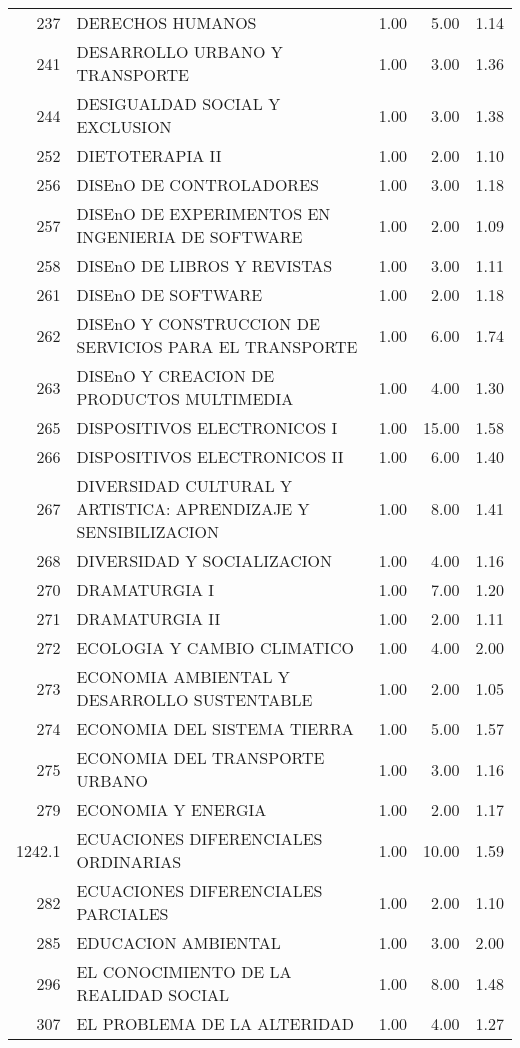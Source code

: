 \documentclass[12pt]{article}
\begin{document}
\begin{table}[ht]
\begin{tabular}{rlrrr}
  237 & DERECHOS HUMANOS & 1.00 & 5.00 & 1.14 \\ 
  241 & DESARROLLO URBANO Y TRANSPORTE & 1.00 & 3.00 & 1.36 \\ 
  244 & DESIGUALDAD SOCIAL Y EXCLUSION & 1.00 & 3.00 & 1.38 \\ 
  252 & DIETOTERAPIA II & 1.00 & 2.00 & 1.10 \\ 
  256 & DISEnO DE CONTROLADORES & 1.00 & 3.00 & 1.18 \\ 
  257 & DISEnO DE EXPERIMENTOS EN INGENIERIA DE SOFTWARE & 1.00 & 2.00 & 1.09 \\ 
  258 & DISEnO DE LIBROS Y REVISTAS & 1.00 & 3.00 & 1.11 \\ 
  261 & DISEnO DE SOFTWARE & 1.00 & 2.00 & 1.18 \\ 
  262 & DISEnO Y CONSTRUCCION DE SERVICIOS PARA EL TRANSPORTE & 1.00 & 6.00 & 1.74 \\ 
  263 & DISEnO Y CREACION DE PRODUCTOS MULTIMEDIA & 1.00 & 4.00 & 1.30 \\ 
  265 & DISPOSITIVOS ELECTRONICOS I & 1.00 & 15.00 & 1.58 \\ 
  266 & DISPOSITIVOS ELECTRONICOS II & 1.00 & 6.00 & 1.40 \\ 
  267 & DIVERSIDAD CULTURAL Y ARTISTICA: APRENDIZAJE Y SENSIBILIZACION & 1.00 & 8.00 & 1.41 \\ 
  268 & DIVERSIDAD Y SOCIALIZACION & 1.00 & 4.00 & 1.16 \\ 
  270 & DRAMATURGIA I & 1.00 & 7.00 & 1.20 \\ 
  271 & DRAMATURGIA II & 1.00 & 2.00 & 1.11 \\ 
  272 & ECOLOGIA Y CAMBIO CLIMATICO & 1.00 & 4.00 & 2.00 \\ 
  273 & ECONOMIA AMBIENTAL Y DESARROLLO SUSTENTABLE & 1.00 & 2.00 & 1.05 \\ 
  274 & ECONOMIA DEL SISTEMA TIERRA & 1.00 & 5.00 & 1.57 \\ 
  275 & ECONOMIA DEL TRANSPORTE URBANO & 1.00 & 3.00 & 1.16 \\ 
  279 & ECONOMIA Y ENERGIA & 1.00 & 2.00 & 1.17 \\ 
  1242.1 & ECUACIONES DIFERENCIALES ORDINARIAS & 1.00 & 10.00 & 1.59 \\ 
  282 & ECUACIONES DIFERENCIALES PARCIALES & 1.00 & 2.00 & 1.10 \\ 
  285 & EDUCACION AMBIENTAL & 1.00 & 3.00 & 2.00 \\ 
  296 & EL CONOCIMIENTO DE LA REALIDAD SOCIAL & 1.00 & 8.00 & 1.48 \\ 
  307 & EL PROBLEMA DE LA ALTERIDAD & 1.00 & 4.00 & 1.27 \\ 

\end{tabular}
\end{table}
\end{document}
